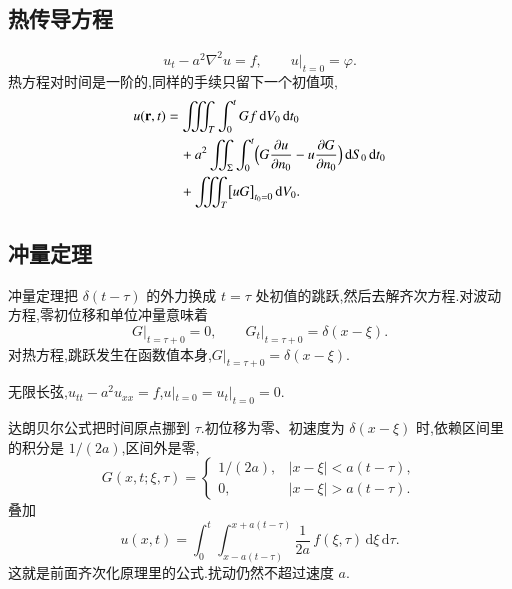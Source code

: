 \subsection{热传导方程}
\begin{equation}
  u_t-a^2\nabla^2 u=f,
  \qquad
  u|_{t=0}=\varphi.
\end{equation}
热方程对时间是一阶的,同样的手续只留下一个初值项,
\begin{equation}
\begin{aligned}
  u({\mathbf{r}},t)
  &=\iiint_{T}\int_0^{t} G f\,\mathrm{d}V_0\,\mathrm{d}t_0 \\
  &\quad+a^2\iint_{\Sigma}\int_0^{t}
      \Bigl(G\frac{\partial u}{\partial n_0}-u\frac{\partial G}{\partial n_0}\Bigr)
      \,\mathrm{d}S_0\,\mathrm{d}t_0 \\
  &\quad+\iiint_{T}\bigl[u G\bigr]_{t_0=0}\,\mathrm{d}V_0.
\end{aligned}
\label{eq:gf-heat-rep}
\end{equation}

\subsection{冲量定理}
冲量定理把 $\delta(t-\tau)$ 的外力换成 $t=\tau$ 处初值的跳跃,然后去解齐次方程.对波动方程,零初位移和单位冲量意味着
\begin{equation}
  G\big|_{t=\tau+0}=0,
  \qquad
  G_t\big|_{t=\tau+0}=\delta(x-\xi).
\end{equation}
对热方程,跳跃发生在函数值本身,$G|_{t=\tau+0}=\delta(x-\xi)$.

\begin{example}
无限长弦,$u_{tt}-a^2 u_{xx}=f$,$u|_{t=0}=u_t|_{t=0}=0$.
\end{example}
\begin{solution}
达朗贝尔公式把时间原点挪到 $\tau$.初位移为零、初速度为 $\delta(x-\xi)$ 时,依赖区间里的积分是 $1/(2a)$,区间外是零,
\begin{equation}
  G(x,t;\xi,\tau)
  =
  \begin{cases}
    1/(2a), & |x-\xi|<a(t-\tau), \\
    0, & |x-\xi|>a(t-\tau).
  \end{cases}
\end{equation}
叠加
\begin{equation}
  u(x,t)
  =\int_0^{t}\int_{x-a(t-\tau)}^{x+a(t-\tau)}
    \frac{1}{2a}\,f(\xi,\tau)\,\mathrm{d}\xi\,\mathrm{d}\tau.
\end{equation}
这就是前面齐次化原理里的公式.扰动仍然不超过速度 $a$.
\end{solution}

